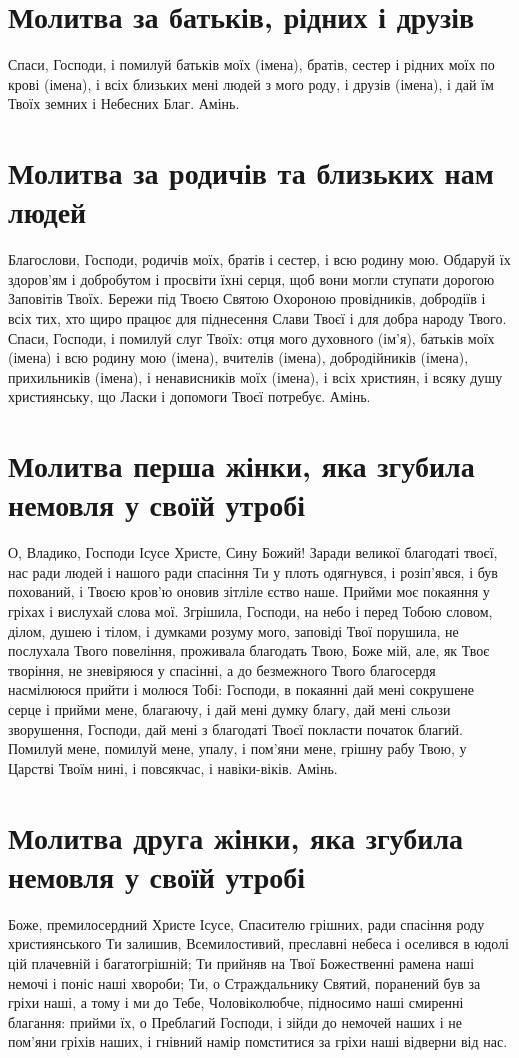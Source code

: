 \documentclass[chapters.tex]{subfiles}
\begin{document}
\section{Молитва за батьків, рідних і друзів}
Спаси, Господи, і помилуй батьків моїх (імена), братів, сестер і рідних моїх по крові (імена), і всіх близьких мені людей з мого роду, і друзів (імена), і дай їм Твоїх земних і Небесних Благ. Амінь.

\section{Молитва за родичів та близьких нам людей}
Благослови, Господи, родичів моїх, братів і сестер, і всю родину мою. Обдаруй їх здоров’ям і добробутом і просвіти їхні серця, щоб вони могли ступати дорогою Заповітів Твоїх. Бережи під Твоєю Святою Охороною провідників, добродіїв і всіх тих, хто щиро працює для піднесення Слави Твоєї і для добра народу Твого. Спаси, Господи, і помилуй слуг Твоїх: отця мого духовного (ім’я), батьків моїх (імена) і всю родину мою (імена), вчителів (імена), добродійників (імена), прихильників (імена), і ненависників моїх (імена), і всіх християн, і всяку душу християнську, що Ласки і допомоги Твоєї потребує. Амінь.

\section{Молитва перша жінки, яка згубила немовля у своїй утробі}
О, Владико, Господи Ісусе Христе, Сину Божий! Заради великої благодаті твоєї, нас ради людей і нашого ради спасіння Ти у плоть одягнувся, і розіп’явся, і був похований, і Твоєю кров’ю оновив зітліле єство наше. Прийми моє покаяння у гріхах і вислухай слова мої. Згрішила, Господи, на небо і перед Тобою словом, ділом, душею і тілом, і думками розуму мого, заповіді Твої порушила, не послухала Твого повеління, проживала благодать Твою, Боже мій, але, як Твоє творіння, не зневіряюся у спасінні, а до безмежного Твого благосердя насмілююся прийти і молюся Тобі: Господи, в покаянні дай мені сокрушене серце і прийми мене, благаючу, і дай мені думку благу, дай мені сльози зворушення, Господи, дай мені з благодаті Твоєї покласти початок благий. Помилуй мене, помилуй мене, упалу, і пом’яни мене, грішну рабу Твою, у Царстві Твоїм нині, і повсякчас, і навіки-віків. Амінь.

\section{Молитва друга жінки, яка згубила немовля у своїй утробі}
Боже, премилосердний Христе Ісусе, Спасителю грішних, ради спасіння роду християнського Ти залишив, Всемилостивий, преславні небеса і оселився в юдолі цій плачевній і багатогрішній; Ти прийняв на Твої Божественні рамена наші немочі і поніс наші хвороби; Ти, о Страждальнику Святий, поранений був за гріхи наші, а тому і ми до Тебе, Чоловіколюбче, підносимо наші смиренні благання: прийми їх, о Преблагий Господи, і зійди до немочей наших і не пом’яни гріхів наших, і гнівний намір помститися за гріхи наші відверни від нас.
\end{document}
